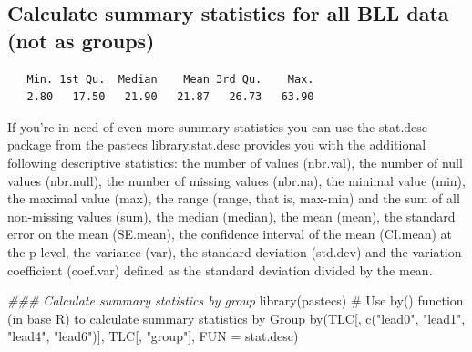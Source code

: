 \documentclass[
  letterpaper,
  DIV=11,
  numbers=noendperiod]{scrreprt}
\newenvironment{Shaded}{\begin{snugshade}}{\end{snugshade}}
\newcommand{\AttributeTok}[1]{\textcolor[rgb]{0.40,0.45,0.13}{#1}}
\newcommand{\CommentTok}[1]{\textcolor[rgb]{0.37,0.37,0.37}{#1}}
\newcommand{\DocumentationTok}[1]{\textcolor[rgb]{0.37,0.37,0.37}{\textit{#1}}}
\newcommand{\FunctionTok}[1]{\textcolor[rgb]{0.28,0.35,0.67}{#1}}
\newcommand{\NormalTok}[1]{\textcolor[rgb]{0.00,0.23,0.31}{#1}}
\newcommand{\OtherTok}[1]{\textcolor[rgb]{0.00,0.23,0.31}{#1}}
\newcommand{\SpecialCharTok}[1]{\textcolor[rgb]{0.37,0.37,0.37}{#1}}
\newcommand{\StringTok}[1]{\textcolor[rgb]{0.13,0.47,0.30}{#1}}
\begin{document}
\hypertarget{calculate-summary-statistics-for-all-bll-data-not-as-groups}{%
\subsection{Calculate summary statistics for all BLL data (not as
groups)}\label{calculate-summary-statistics-for-all-bll-data-not-as-groups}}

\begin{Shaded}
\end{Shaded}

\begin{verbatim}
   Min. 1st Qu.  Median    Mean 3rd Qu.    Max. 
   2.80   17.50   21.90   21.87   26.73   63.90 
\end{verbatim}

If you're in need of even more summary statistics you can use the
stat.desc package from the pastecs library.stat.desc provides you with
the additional following descriptive statistics: the number of values
(nbr.val), the number of null values (nbr.null), the number of missing
values (nbr.na), the minimal value (min), the maximal value (max), the
range (range, that is, max-min) and the sum of all non-missing values
(sum), the median (median), the mean (mean), the standard error on the
mean (SE.mean), the confidence interval of the mean (CI.mean) at the p
level, the variance (var), the standard deviation (std.dev) and the
variation coefficient (coef.var) defined as the standard deviation
divided by the mean.

\begin{Shaded}
\begin{Highlighting}[]
\DocumentationTok{\#\#\# Calculate summary statistics by group}
\FunctionTok{library}\NormalTok{(pastecs)}
\CommentTok{\# Use by() function (in base R) to calculate summary statistics by Group}
\FunctionTok{by}\NormalTok{(TLC[, }\FunctionTok{c}\NormalTok{(}\StringTok{"lead0"}\NormalTok{, }\StringTok{"lead1"}\NormalTok{, }\StringTok{"lead4"}\NormalTok{, }\StringTok{"lead6"}\NormalTok{)], TLC[, }\StringTok{"group"}\NormalTok{], }\AttributeTok{FUN =}\NormalTok{ stat.desc)}
\end{Highlighting}
\end{Shaded}
\end{document}
